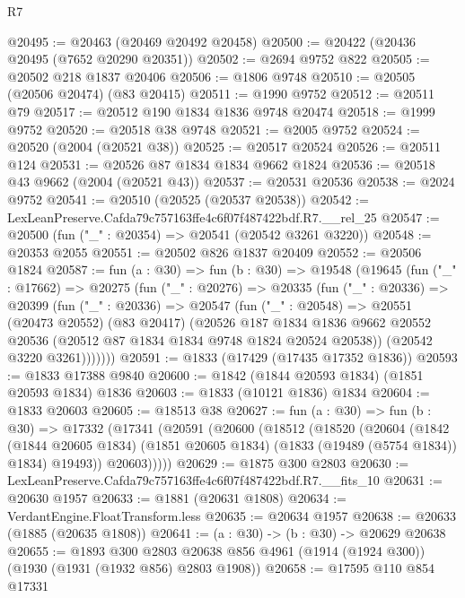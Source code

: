 \begin{lexlean}{R7}
\begin{coremodule}
@20495 := @20463 (@20469 @20492 @20458)
@20500 := @20422 (@20436 @20495 (@7652 @20290 @20351))
@20502 := @2694 @9752 @822
@20505 := @20502 @218 @1837 @20406
@20506 := @1806 @9748
@20510 := @20505 (@20506 @20474) (@83 @20415)
@20511 := @1990 @9752
@20512 := @20511 @79
@20517 := @20512 @190 @1834 @1836 @9748 @20474
@20518 := @1999 @9752
@20520 := @20518 @38 @9748
@20521 := @2005 @9752
@20524 := @20520 (@2004 (@20521 @38))
@20525 := @20517 @20524
@20526 := @20511 @124
@20531 := @20526 @87 @1834 @1834 @9662 @1824
@20536 := @20518 @43 @9662 (@2004 (@20521 @43))
@20537 := @20531 @20536
@20538 := @2024 @9752
@20541 := @20510 (@20525 (@20537 @20538))
@20542 := LexLeanPreserve.Cafda79c757163ffe4c6f07f487422bdf.R7.__rel_25
@20547 := @20500 (fun ("_" : @20354) => @20541 (@20542 @3261 @3220))
@20548 := @20353 @2055
@20551 := @20502 @826 @1837 @20409
@20552 := @20506 @1824
@20587 := fun (a : @30) =>
  fun (b : @30) =>
  @19548
    (@19645
      (fun ("_" : @17662) =>
      @20275
        (fun ("_" : @20276) =>
        @20335
          (fun ("_" : @20336) =>
          @20399
            (fun ("_" : @20336) =>
            @20547
              (fun ("_" : @20548) =>
              @20551
                (@20473 @20552)
                (@83 @20417)
                (@20526
                  @187
                  @1834
                  @1836
                  @9662
                  @20552
                  @20536
                  (@20512 @87 @1834 @1834 @9748 @1824 @20524 @20538))
                (@20542 @3220 @3261)))))))
@20591 := @1833 (@17429 (@17435 @17352 @1836))
@20593 := @1833 @17388 @9840
@20600 := @1842 (@1844 @20593 @1834) (@1851 @20593 @1834) @1836
@20603 := @1833 (@10121 @1836) @1834
@20604 := @1833 @20603
@20605 := @18513 @38
@20627 := fun (a : @30) =>
  fun (b : @30) =>
  @17332
    (@17341
      (@20591
        (@20600
          (@18512
            (@18520
              (@20604
                (@1842
                  (@1844 @20605 @1834)
                  (@1851 @20605 @1834)
                  (@1833 (@19489 (@5754 @1834)) @1834)
                  @19493))
              @20603)))))
@20629 := @1875 @300 @2803
@20630 := LexLeanPreserve.Cafda79c757163ffe4c6f07f487422bdf.R7.__fits_10
@20631 := @20630 @1957
@20633 := @1881 (@20631 @1808)
@20634 := VerdantEngine.FloatTransform.less
@20635 := @20634 @1957
@20638 := @20633 (@1885 (@20635 @1808))
@20641 := (a : @30) -> (b : @30) -> @20629 @20638
@20655 := @1893
    @300
    @2803
    @20638
    @856
    @4961
    (@1914 (@1924 @300))
    (@1930 (@1931 (@1932 @856) @2803 @1908))
@20658 := @17595 @110 @854 @17331

\end{coremodule}
\end{lexlean}
